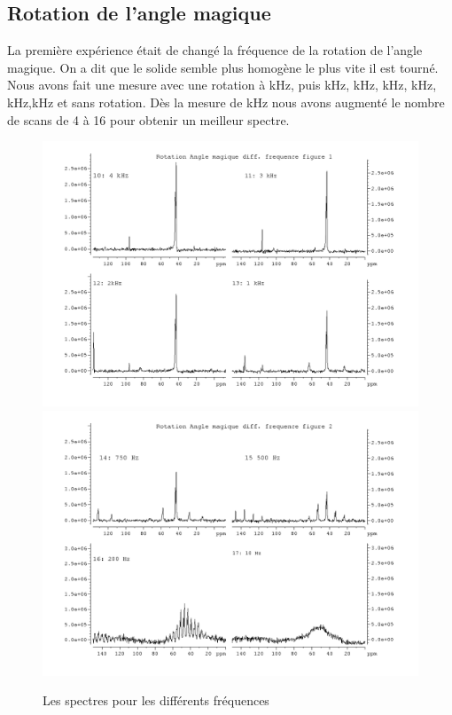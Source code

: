 \documentclass[a4paper,12pt]{scrartcl}
\begin{document}
  \subsection{Rotation de l'angle magique}
   La première expérience était de changé la fréquence de la rotation de l'angle magique. On a dit que le solide semble plus homogène le plus vite il est tourné. Nous avons fait une mesure avec une rotation à \unit[4]{kHz}, puis \unit[3]{kHz}, \unit[2]{kHz}, \unit[1]{kHz}, \unit[0,75]{kHz}, \unit[0,5]{kHz},\unit[0,2]{kHz} et sans rotation. Dès la mesure de \unit[0,75]{kHz} nous avons augmenté le nombre de scans de 4 à 16 pour obtenir un meilleur spectre. 
   \begin{figure}[H]
   \includegraphics[width=\textwidth]{bilder/rotation.png}
    \includegraphics[width=\textwidth]{bilder/rotation2.png}
    \caption{\label{rotation}Les spectres pour les différents fréquences}
   \end{figure}
\end{document}
